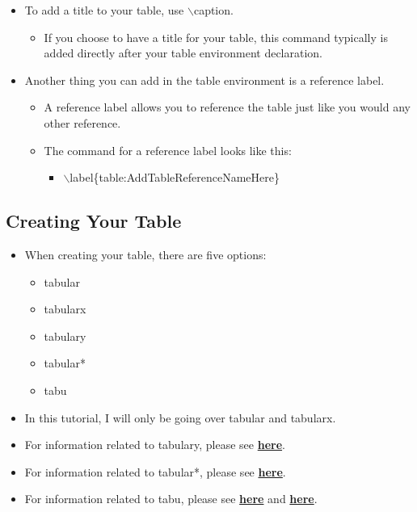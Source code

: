 \begin{itemize}
				\item To add a title to your table, use $\backslash$caption.
				\begin{itemize}
					\item If you choose to have a title for your table, this command typically is added directly after your table environment declaration.
				\end{itemize}
				\item Another thing you can add in the table environment is a reference label.
				\begin{itemize}
					\item A reference label allows you to reference the table just like you would any other reference.
					\item The command for a reference label looks like this:
					\begin{itemize}
						\item $\backslash$label\{table:AddTableReferenceNameHere\}
					\end{itemize}
				\end{itemize}
			\end{itemize}
	
	\subsection{Creating Your Table}
		\begin{itemize}
			\item When creating your table, there are five options:
			\begin{itemize}
				\item tabular
				\item tabularx
				\item tabulary
				\item tabular*
				\item tabu
			\end{itemize}
			\item In this tutorial, I will only be going over tabular and tabularx.
			\item For information related to tabulary, please see \href{https://en.wikibooks.org/wiki/LaTeX/Tables#The_tabular*_environment}{\textbf{here}}.
			\item For information related to tabular*, please see \href{https://en.wikibooks.org/wiki/LaTeX/Tables#The_tabular*_environment}{\textbf{here}}.		
			\item For information related to tabu, please see \href{https://en.wikibooks.org/wiki/LaTeX/Tables#The_tabu_environment}{\textbf{here}} and \href{http://mirrors.ibiblio.org/CTAN/macros/latex/contrib/tabu/tabu.pdf}{\textbf{here}}.
		\end{itemize}
		
